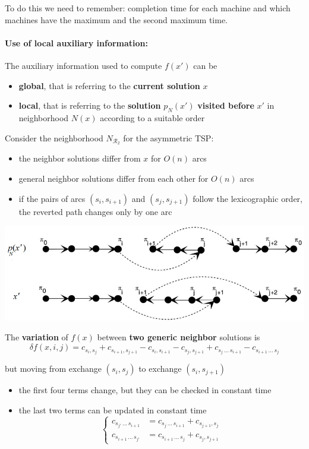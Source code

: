 To do this we need to remember: completion time for each machine and which machines have the maximum and the second maximum time.

\newpage

\paragraph{Use of local auxiliary information:} The auxiliary information used to compute $f (x')$ can be
\begin{itemize}
	\item \textbf{global}, that is referring to the \textbf{current solution} $x$
	
	\item \textbf{local}, that is referring to the \textbf{solution} $p_N (x')$ \textbf{visited before} $x'$ in neighborhood $N (x)$ according to a suitable order
\end{itemize}

Consider the neighborhood $N_{\mathcal{R}_2}$ for the asymmetric TSP:
\begin{itemize}
	\item the neighbor solutions differ from $x$ for $O (n)$ arcs
	
	\item general neighbor solutions differ from each other for $O (n)$ arcs
	
	\item if the pairs of arcs $(s_i , s_{i+1})$ and $(s_j , s_{j+1})$ follow the lexicographic order, the reverted path changes only by one arc
\end{itemize}

\begin{center}
	\includegraphics[width=0.9\columnwidth]{img/TSP4}
\end{center}

The \textbf{variation} of $f (x)$ between \textbf{two generic neighbor} solutions is
$$ \delta f (x, i, j) = c_{s_i ,s_j} + c_{s_{i+1}, s_{j+1}} - c_{s_i ,s_{i+1}} - c_{s_j ,s_{j+1}} + c_{s_j \, ... \, s_{i+1}} - c_{s_{i+1} \, ... \, s_j} $$

but moving from exchange $(s_i , s_j )$ to exchange $(s_i , s_{j+1})$
\begin{itemize}
	\item the first four terms change, but they can be checked in constant time
	
	\item the last two terms can be updated in constant time
	$$ \begin{cases}
		c_{s_{j'} \, ... \, s_{i+1}} & = c_{s_j \, ... \, s_{i+1}} + c_{s_{j+1},s_j} \\
		c_{s_{i+1} \, ... \, s_{j'}} & = c_{s_{i+1} \, ... \, s_j} + c_{s_j ,s_{j+1}}
	\end{cases}$$
\end{itemize}

